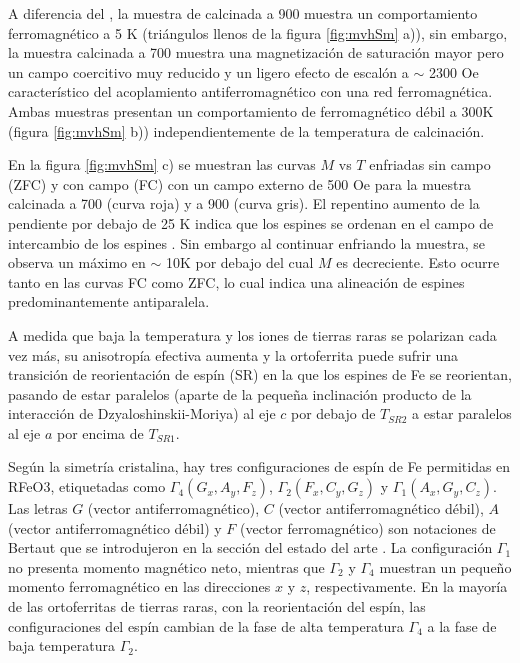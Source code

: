 \documentclass[../main.tex]{subfiles}
\begin{document}
A diferencia del \neod{}, la muestra de \sama{} calcinada a 900\gradoC{} muestra un comportamiento ferromagnético a 5 K (triángulos llenos de la figura \ref{fig:mvhSm} a)), sin embargo, la muestra calcinada a 700\gradoC{} muestra una magnetización de saturación mayor pero un campo coercitivo muy reducido y un ligero efecto de escalón a $\sim$ 2300 Oe característico del acoplamiento antiferromagnético con una red ferromagnética. Ambas muestras presentan un comportamiento de ferromagnético débil a 300K (figura \ref{fig:mvhSm} b)) independientemente de la temperatura de calcinación.

En la figura \ref{fig:mvhSm} c) se muestran las curvas $M$ vs $T$ enfriadas sin campo (ZFC) y con campo (FC) con un campo externo de 500 Oe para la muestra calcinada a 700\gradoC{} (curva roja) y a 900\gradoC{} (curva gris).  El repentino aumento de la pendiente por debajo de 25 K indica que los espines  se ordenan en el campo de intercambio de los espines . Sin embargo al continuar enfriando la muestra, se observa un máximo en $\sim$ 10K por debajo del cual $M$ es decreciente. Esto ocurre tanto en las curvas FC como ZFC, lo cual indica una alineación de espines predominantemente antiparalela.

A medida que baja la temperatura y los iones de tierras raras se polarizan cada vez más, su anisotropía efectiva aumenta y la ortoferrita puede sufrir una transición de reorientación de espín (SR) en la que los espines de Fe se reorientan, pasando de estar paralelos (aparte de la pequeña inclinación producto de la interacción de Dzyaloshinskii-Moriya) al eje $c$ por debajo de $T_{SR2}$ a estar paralelos al eje $a$ por encima de $T_{SR1}$.

Según la simetría cristalina, hay tres configuraciones de espín de Fe permitidas en RFeO3, etiquetadas como $\Gamma_{4} (G_{x}, A_{y}, F_{z})$, $\Gamma_{2} (F_{x}, C_{y}, G_{z})$ y $\Gamma_{1} (A_{x}, G_{y}, C_{z})$. Las letras $G$ (vector antiferromagnético), $C$ (vector antiferromagnético débil), $A$ (vector antiferromagnético débil) y $F$ (vector ferromagnético) son notaciones de Bertaut que se introdujeron en la sección del estado del arte \cite{Bertaut1963}. La configuración $\Gamma_{1}$ no presenta momento magnético neto, mientras que $\Gamma_{2}$ y $\Gamma_{4}$ muestran un pequeño momento  ferromagnético en las direcciones $x$ y $z$, respectivamente. En la mayoría de las ortoferritas de tierras raras, con la reorientación del espín, las configuraciones del espín cambian de la fase de alta temperatura $\Gamma_{4}$ a la fase de baja temperatura $\Gamma_{2}$.
\end{document}
